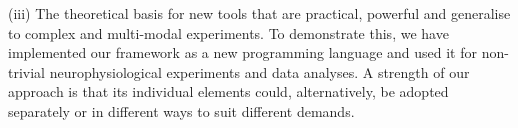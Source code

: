(iii) The theoretical basis for new tools that are practical, powerful
and generalise to complex and multi-modal experiments. To demonstrate
this, we have implemented our framework as a new programming language
and used it for non-trivial neurophysiological experiments and data
analyses. A strength of our approach is that its individual elements
could, alternatively, be adopted separately or in different ways to
suit different demands.
